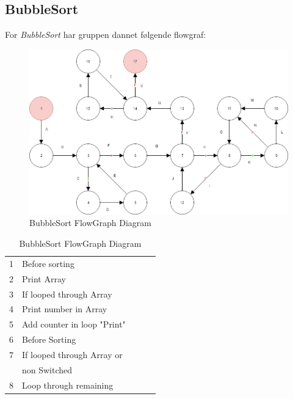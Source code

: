 \documentclass[11pt]{article}
\begin{document}
    \subsection{BubbleSort}\noindent
    For \textit{BubbleSort} har gruppen dannet følgende flowgraf:\\
    \begin{table}[H]
        \begin{minipage}{.65\textwidth}
            \begin{figure}[H]
            \centering
            \includegraphics[width=1\textwidth,angle=0]{Struktureret_System_Udvikling/Workshop_3/Booble_Sort_Flowgraph.png}
            \caption{BubbleSort FlowGraph Diagram}
            \label{fig:BoobleSortGraph}
            \end{figure}
        \end{minipage}
        \begin{minipage}{.35\textwidth}
            \quad
            \small
            \begin{tabular}{lllll}
                1 & Before sorting\\
                2 & Print Array\\
                3 & If looped through Array\\
                4 & Print number in Array\\
                5 & Add counter in loop "Print"\\
                6 & Before Sorting\\
                7 & If looped through Array or\\
                & non Switched\\
                8 & Loop through remaining\\

\end{tabular}
\end{minipage}
\end{table}
\end{document}
